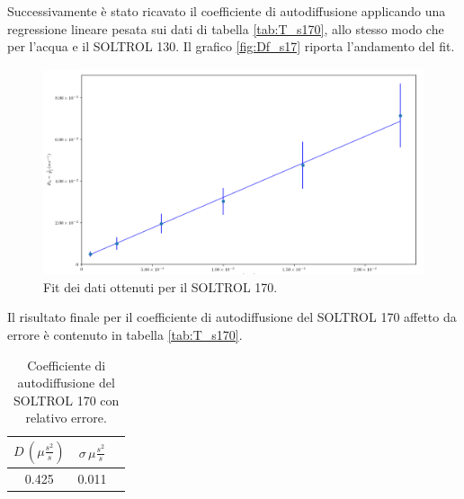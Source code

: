 Successivamente è stato ricavato il coefficiente di autodiffusione applicando una regressione lineare pesata sui dati di tabella \ref{tab:T_s170}, allo stesso modo che per l'acqua e il SOLTROL 130.
Il grafico \ref{fig:Df_s17} riporta l'andamento del fit.

\begin{figure}[h!]
\centering
\includegraphics[scale=0.3]{Figure/SOLTROL170_calc.png}
\caption{Fit dei dati ottenuti per il SOLTROL 170.}
\label{fig:Df_s170}
\end{figure}

Il risultato finale per il coefficiente di autodiffusione del SOLTROL 170 affetto da errore è contenuto in tabella \ref{tab:T_s170}. 


\begin{table}[h!]
    \begin{center}
    \begin{tabular}{c c c}
    \toprule
    	$D\,({\mu}\frac{s^2}{s})$ & $\sigma\,{\mu}\frac{s^2}{s}$ \\
    \midrule
    	0.425	&	0.011	\\
    \bottomrule
    \end{tabular}
    \caption{Coefficiente di autodiffusione del SOLTROL 170 con relativo errore.}
    \label{tab:Df_s170}
    \end{center}
\end{table}




